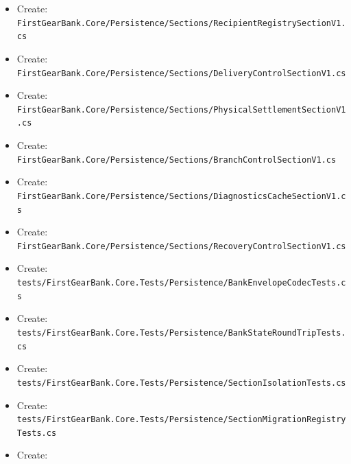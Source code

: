 \documentclass[
  10pt,
  letterpaper,
]{article}
\begin{document}
\begin{itemize}
\item
  Create:
  \texttt{FirstGearBank.}\allowbreak{}\texttt{Core/}\allowbreak{}\texttt{Persistence/}\allowbreak{}\texttt{Sections/}\allowbreak{}\texttt{RecipientRegistrySectionV1.}\allowbreak{}\texttt{cs}
\item
  Create:
  \texttt{FirstGearBank.}\allowbreak{}\texttt{Core/}\allowbreak{}\texttt{Persistence/}\allowbreak{}\texttt{Sections/}\allowbreak{}\texttt{DeliveryControlSectionV1.}\allowbreak{}\texttt{cs}
\item
  Create:
  \texttt{FirstGearBank.}\allowbreak{}\texttt{Core/}\allowbreak{}\texttt{Persistence/}\allowbreak{}\texttt{Sections/}\allowbreak{}\texttt{PhysicalSettlementSectionV1.}\allowbreak{}\texttt{cs}
\item
  Create:
  \texttt{FirstGearBank.}\allowbreak{}\texttt{Core/}\allowbreak{}\texttt{Persistence/}\allowbreak{}\texttt{Sections/}\allowbreak{}\texttt{BranchControlSectionV1.}\allowbreak{}\texttt{cs}
\item
  Create:
  \texttt{FirstGearBank.}\allowbreak{}\texttt{Core/}\allowbreak{}\texttt{Persistence/}\allowbreak{}\texttt{Sections/}\allowbreak{}\texttt{DiagnosticsCacheSectionV1.}\allowbreak{}\texttt{cs}
\item
  Create:
  \texttt{FirstGearBank.}\allowbreak{}\texttt{Core/}\allowbreak{}\texttt{Persistence/}\allowbreak{}\texttt{Sections/}\allowbreak{}\texttt{RecoveryControlSectionV1.}\allowbreak{}\texttt{cs}
\item
  Create:
  \texttt{tests/}\allowbreak{}\texttt{FirstGearBank.}\allowbreak{}\texttt{Core.}\allowbreak{}\texttt{Tests/}\allowbreak{}\texttt{Persistence/}\allowbreak{}\texttt{BankEnvelopeCodecTests.}\allowbreak{}\texttt{cs}
\item
  Create:
  \texttt{tests/}\allowbreak{}\texttt{FirstGearBank.}\allowbreak{}\texttt{Core.}\allowbreak{}\texttt{Tests/}\allowbreak{}\texttt{Persistence/}\allowbreak{}\texttt{BankStateRoundTripTests.}\allowbreak{}\texttt{cs}
\item
  Create:
  \texttt{tests/}\allowbreak{}\texttt{FirstGearBank.}\allowbreak{}\texttt{Core.}\allowbreak{}\texttt{Tests/}\allowbreak{}\texttt{Persistence/}\allowbreak{}\texttt{SectionIsolationTests.}\allowbreak{}\texttt{cs}
\item
  Create:
  \texttt{tests/}\allowbreak{}\texttt{FirstGearBank.}\allowbreak{}\texttt{Core.}\allowbreak{}\texttt{Tests/}\allowbreak{}\texttt{Persistence/}\allowbreak{}\texttt{SectionMigrationRegistryTests.}\allowbreak{}\texttt{cs}
\item
  Create:

\end{itemize}
\end{document}
